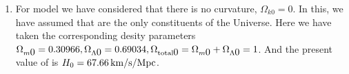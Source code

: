 \documentclass[a4paper,11pt,oneside,english,openany]{sphinxmanual}
\begin{document}
\begin{fulllineitems}
\begin{enumerate}
\item {} 
\sphinxAtStartPar
For  model we have considered that there is no curvature, \(\Omega_{k0} = 0\). In this, we have assumed that  are the only constituents of the Universe. Here we have taken the corresponding desity parameters \(\Omega_{m\displaystyle 0} = 0.30966, \Omega_{\Lambda\displaystyle 0} = 0.69034, \Omega_{\rm total\displaystyle 0} = \Omega_{m\displaystyle 0} + \Omega_{\Lambda\displaystyle 0} = 1\). And the present value of  is \(H_{0} = 67.66\,\rm km/s/Mpc\).

\end{enumerate}

\clearpage

\end{fulllineitems}

\end{document}
